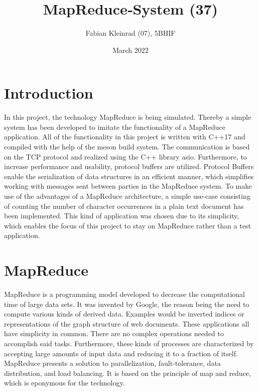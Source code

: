 \documentclass[12pt, letterpaper]{article}
\title{MapReduce‐System (37)}
\author{Fabian Kleinrad (07), 5BHIF}
\date{March 2022}
\begin{document}
\begin{titlepage}
\maketitle
\end{titlepage}

\tableofcontents
\newpage

\section{Introduction}

In this project, the technology MapReduce is being simulated. Thereby a simple system has been developed to imitate the functionality of a MapReduce application. All of the functionality in this project is written with C++17 and compiled with the help of the meson build system. The communication is based on the TCP protocol and realized using the C++ library asio.\newline
Furthermore, to increase performance and usability, protocol buffers are utilized. Protocol Buffers enable the serialization of data structures in an efficient manner, which simplifies working with messages sent between parties in the MapReduce system.\newline
To make use of the advantages of a MapReduce architecture, a simple use-case consisting of counting the number of character occurrences in a plain text document has been implemented. This kind of application was chosen due to its simplicity, which enables the focus of this project to stay on MapReduce rather than a test application. 

\section{MapReduce}

MapReduce is a programming model developed to decrease the computational time of large data sets. It was invented by Google, the reason being the need to compute various kinds of derived data. Examples would be inverted indices or representations of the graph structure of web documents. These applications all have simplicity in common. There are no complex operations needed to accomplish said tasks. Furthermore, these kinds of processes are characterized by accepting large amounts of input data and reducing it to a fraction of itself. MapReduce presents a solution to parallelization, fault-tolerance, data distribution, and load balancing. It is based on the principle of map and reduce, which is eponymous for the technology.
\end{document}
